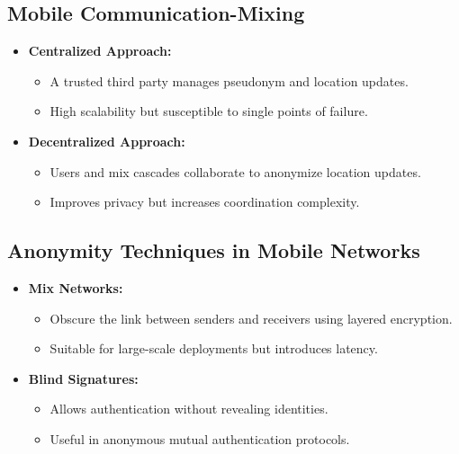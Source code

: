 \documentclass{article}
\begin{document}
\subsection{Mobile Communication-Mixing}
\begin{itemize}
    \item \textbf{Centralized Approach:}
    \begin{itemize}
        \item A trusted third party manages pseudonym and location updates.
        \item High scalability but susceptible to single points of failure.
    \end{itemize}
    \item \textbf{Decentralized Approach:}
    \begin{itemize}
        \item Users and mix cascades collaborate to anonymize location updates.
        \item Improves privacy but increases coordination complexity.
    \end{itemize}
\end{itemize}

\subsection{Anonymity Techniques in Mobile Networks}
\begin{itemize}
    \item \textbf{Mix Networks:}
    \begin{itemize}
        \item Obscure the link between senders and receivers using layered encryption.
        \item Suitable for large-scale deployments but introduces latency.
    \end{itemize}
    \item \textbf{Blind Signatures:}
    \begin{itemize}
        \item Allows authentication without revealing identities.
        \item Useful in anonymous mutual authentication protocols.
    \end{itemize}
\end{itemize}
\end{document}
